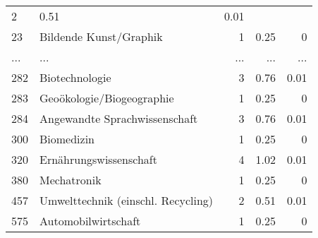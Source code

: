 \begin{longtable}{lXrrr}
          \num{2} &
          \num[round-mode=places,round-precision=2]{0,51} &
          \num[round-mode=places,round-precision=2]{0,01} \\
        23 & \multicolumn{1}{X}{Bildende Kunst/Graphik} & %
          \num{1} &
          \num[round-mode=places,round-precision=2]{0,25} &
          \num[round-mode=places,round-precision=2]{0} \\
       ... & ... & ... & ... & ... \\
        282 & \multicolumn{1}{X}{Biotechnologie} & %
          \num{3} &
          \num[round-mode=places,round-precision=2]{0,76} &
          \num[round-mode=places,round-precision=2]{0,01} \\

        283 & \multicolumn{1}{X}{Geoökologie/Biogeographie} & %
          \num{1} &
          \num[round-mode=places,round-precision=2]{0,25} &
          \num[round-mode=places,round-precision=2]{0} \\

        284 & \multicolumn{1}{X}{Angewandte Sprachwissenschaft} & %
          \num{3} &
          \num[round-mode=places,round-precision=2]{0,76} &
          \num[round-mode=places,round-precision=2]{0,01} \\

        300 & \multicolumn{1}{X}{Biomedizin} & %
          \num{1} &
          \num[round-mode=places,round-precision=2]{0,25} &
          \num[round-mode=places,round-precision=2]{0} \\

        320 & \multicolumn{1}{X}{Ernährungswissenschaft} & %
          \num{4} &
          \num[round-mode=places,round-precision=2]{1,02} &
          \num[round-mode=places,round-precision=2]{0,01} \\

        380 & \multicolumn{1}{X}{Mechatronik} & %
          \num{1} &
          \num[round-mode=places,round-precision=2]{0,25} &
          \num[round-mode=places,round-precision=2]{0} \\

        457 & \multicolumn{1}{X}{Umwelttechnik (einschl. Recycling)} & %
          \num{2} &
          \num[round-mode=places,round-precision=2]{0,51} &
          \num[round-mode=places,round-precision=2]{0,01} \\

        575 & \multicolumn{1}{X}{Automobilwirtschaft} & %
          \num{1} &
          \num[round-mode=places,round-precision=2]{0,25} &
          \num[round-mode=places,round-precision=2]{0} \\


\end{longtable}

